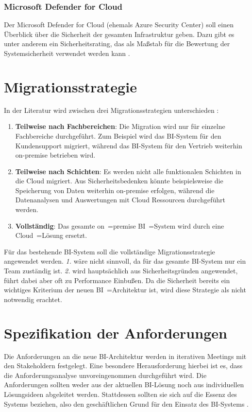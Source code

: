 \subsubsection{Microsoft Defender for Cloud} \label{subsec:grundlagen:azure:sicherheitUndDatenschutz:asc}
Der Microsoft Defender for Cloud (ehemals Azure Security Center) soll einen Überblick über die Sicherheit der gesamten Infrastruktur geben. Dazu gibt es unter anderem ein Sicherheitsrating, das als Maßstab für die Bewertung der Systemsicherheit verwendet werden kann \cite{buchanan_azure_2022}.

\section{Migrationsstrategie} \label{sec:beschreibungMigrationsstrategie}
In der Literatur wird zwischen drei Migrationsstrategien unterschieden \cite{juan-verdejo_moving_2014}:
\begin{enumerate}
\item \textbf{Teilweise nach Fachbereichen}: Die Migration wird nur für einzelne Fachbereiche durchgeführt. Zum Beispiel wird das BI-System für den Kundensupport migriert, während das BI-System für den Vertrieb weiterhin on-premise betrieben wird.
\item \textbf{Teilweise nach Schichten}: Es werden nicht alle funktionalen Schichten in die Cloud migriert. Aus Sicherheitsbedenken könnte beispielsweise die Speicherung von Daten weiterhin on-premise erfolgen, während die Datenanalysen und Auswertungen mit Cloud Ressourcen durchgeführt werden.
\item \textbf{Vollständig}: Das gesamte on~=premise BI~=System wird durch eine Cloud~=Lösung ersetzt.
\end{enumerate}
Für das bestehende BI-System soll die vollständige Migrationsstrategie angewendet werden. \textit{1.} wäre nicht sinnvoll, da für das gesamte BI-System nur ein Team zuständig ist. \textit{2.} wird hauptsächlich aus Sicherheitsgründen angewendet, führt dabei aber oft zu Performance Einbußen. Da die Sicherheit bereits ein wichtiges Kriterium der neuen BI~=Architektur ist, wird diese Strategie als nicht notwendig erachtet.

\section{Spezifikation der Anforderungen}
Die Anforderungen an die neue BI-Architektur werden in iterativen Meetings mit den Stakeholdern festgelegt. Eine besondere Herausforderung hierbei ist es, dass die Anforderungsanalyse unvoreingenommen durchgeführt wird. Die Anforderungen sollten weder aus der aktuellen BI-Lösung noch aus individuellen Lösungsideen abgeleitet werden. Stattdessen sollten sie sich auf die Essenz des Systems beziehen, also den geschäftlichen Grund für den Einsatz des BI-Systems \cite[vgl.][]{robertson_mastering_2013}.

